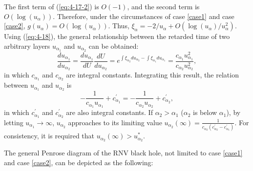 \documentclass[letterpaper,12pt]{article}
\begin{document}
The first term of (\ref{eq:4-17-2}) is $O(-1)$, and the second term is $O(\log(u_{\alpha}))$. Therefore, under the circumstances of case \ref{case1} and case \ref{case2}, $g(u_{\alpha}) = O(\log(u_{\alpha}))$. Thus, $\xi_{\alpha} = -2 / u_{\alpha} +O(\log(u_{\alpha})/u_{\alpha}^{2})$. Using (\ref{eq:4-18}), the general relationship between the retarded time of two arbitrary layers $u_{\alpha_{1}}$ and $u_{\alpha_{2}}$ can be obtained:
\begin{equation}
\frac{du_{\alpha_{1}}}{du_{\alpha_{2}}} = \frac{du_{\alpha_{1}}}{dU}\frac{dU}{du_{\alpha_{2}}}=   e^{\int \xi_{\alpha_{2}} du_{\alpha_{2}}-\int \xi_{\alpha_{1}} du_{\alpha_{1}}} = \frac{c_{\alpha_{1}}u_{\alpha_{1}}^{2}}{c_{\alpha_{2}}u_{\alpha_{2}}^{2}},
\end{equation}
in which $c_{\alpha_{1}}$ and $c_{\alpha_{2}}$ are integral constants. Integrating this result, the relation between $u_{\alpha_{1}}$ and $u_{\alpha_{2}}$ is
\begin{equation}
-\frac{1}{c_{\alpha_{1}}u_{\alpha_{1}}}+c_{\alpha_{1}}^{\prime} = -\frac{1}{c_{\alpha_{2}}u_{\alpha_{2}}}+c_{\alpha_{2}}^{\prime},
\end{equation}
in which $c_{\alpha_{1}}^{\prime}$ and $c_{\alpha_{2}}^{\prime}$ are also integral constants. If $\alpha_{2} > \alpha_{1}$ ($\alpha_{2}$ is below $\alpha_{1}$), by letting $u_{\alpha_{1}}\rightarrow \infty$, $u_{\alpha_{2}}$ approaches to its limiting value $u_{\alpha_{2}}(\infty)=\frac{1}{c_{\alpha_{2}}(c_{\alpha_{2}}^{\prime}-c_{\alpha_{1}}^{\prime})}$. For consistency, it is required that $u_{\alpha_{2}}(\infty) > u_{\alpha_2}^{*}$.

The general Penrose diagram of the RNV black hole, not limited to case \ref{case1} and case \ref{case2}, can be depicted as the following: 
\end{document}
